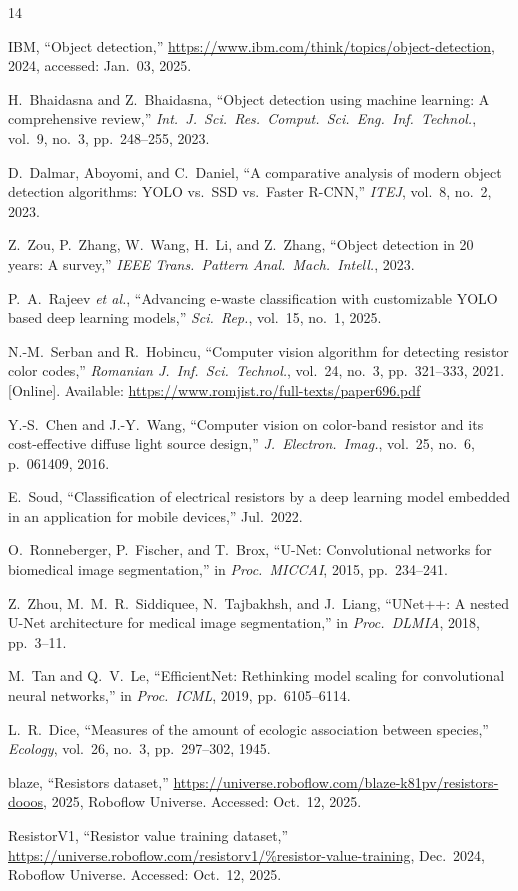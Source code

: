 \documentclass[conference]{IEEEtran}
\begin{document}
\begin{thebibliography}{14}
 
IBM, ``Object detection,''
\url{https://www.ibm.com/think/topics/object-detection}, 2024,
accessed: Jan.\ 03, 2025.
 
H.\ Bhaidasna and Z.\ Bhaidasna,
``Object detection using machine learning: A comprehensive
review,''
\emph{Int.\ J.\ Sci.\ Res.\ Comput.\ Sci.\ Eng.\ Inf.\
Technol.}, vol.\ 9, no.\ 3, pp.\ 248--255, 2023.
 
D.\ Dalmar, Aboyomi, and C.\ Daniel,
``A comparative analysis of modern object detection algorithms:
YOLO vs.\ SSD vs.\ Faster R-CNN,''
\emph{ITEJ}, vol.\ 8, no.\ 2, 2023.
 
Z.\ Zou, P.\ Zhang, W.\ Wang, H.\ Li, and Z.\ Zhang,
``Object detection in 20 years: A survey,''
\emph{IEEE Trans.\ Pattern Anal.\ Mach.\ Intell.}, 2023.
 
P.\ A.\ Rajeev \emph{et al.},
``Advancing e-waste classification with customizable YOLO based
deep learning models,''
\emph{Sci.\ Rep.}, vol.\ 15, no.\ 1, 2025.
 
N.-M.\ Serban and R.\ Hobincu,
``Computer vision algorithm for detecting resistor color
codes,''
\emph{Romanian J.\ Inf.\ Sci.\ Technol.}, vol.\ 24, no.\ 3,
pp.\ 321--333, 2021. [Online]. Available:
\url{https://www.romjist.ro/full-texts/paper696.pdf}
 
Y.-S.\ Chen and J.-Y.\ Wang,
``Computer vision on color-band resistor and its cost-effective
diffuse light source design,''
\emph{J.\ Electron.\ Imag.}, vol.\ 25, no.\ 6,
p.\ 061409, 2016.
 
E.\ Soud,
``Classification of electrical resistors by a deep learning
model embedded in an application for mobile devices,''
Jul.\ 2022.
 
O.\ Ronneberger, P.\ Fischer, and T.\ Brox,
``U-Net: Convolutional networks for biomedical image
segmentation,''
in \emph{Proc.\ MICCAI}, 2015, pp.\ 234--241.
 
Z.\ Zhou, M.\ M.\ R.\ Siddiquee, N.\ Tajbakhsh, and
J.\ Liang,
``UNet++: A nested U-Net architecture for medical image
segmentation,''
in \emph{Proc.\ DLMIA}, 2018, pp.\ 3--11.
 
M.\ Tan and Q.\ V.\ Le,
``EfficientNet: Rethinking model scaling for convolutional
neural networks,''
in \emph{Proc.\ ICML}, 2019, pp.\ 6105--6114.
 
L.\ R.\ Dice,
``Measures of the amount of ecologic association between
species,''
\emph{Ecology}, vol.\ 26, no.\ 3, pp.\ 297--302, 1945.
 
blaze, ``Resistors dataset,''
\url{https://universe.roboflow.com/blaze-k81pv/resistors-dooos},
2025, Roboflow Universe. Accessed: Oct.\ 12, 2025.
 
ResistorV1, ``Resistor value training dataset,''
\url{https://universe.roboflow.com/resistorv1/%resistor-value-training},
Dec.\ 2024, Roboflow Universe. Accessed: Oct.\ 12, 2025.
 
\end{thebibliography}
 
\end{document}
